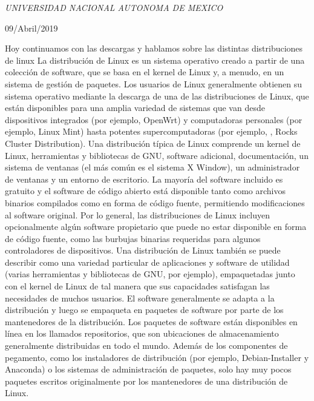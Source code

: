\documentclass[a4paper, 11pt, oneside]{article}
\begin{document}
\begin{titlepage}
	\textit{UNIVERSIDAD NACIONAL AUTONOMA DE MEXICO} 
	
	\vfill
	
	
	
	
	\vspace{0.3\baselineskip} 
	
	09/Abril/2019 
	
	

\end{titlepage}
Hoy continuamos con las descargas y hablamos sobre las distintas distribuciones de linux
La distribución de Linux es un sistema operativo creado a partir de una colección de software, que se basa en el kernel de Linux y, a menudo, en un sistema de gestión de paquetes. Los usuarios de Linux generalmente obtienen su sistema operativo mediante la descarga de una de las distribuciones de Linux, que están disponibles para una amplia variedad de sistemas que van desde dispositivos integrados (por ejemplo, OpenWrt) y computadoras personales (por ejemplo, Linux Mint) hasta potentes supercomputadoras (por ejemplo, , Rocks Cluster Distribution). Una distribución típica de Linux comprende un kernel de Linux, herramientas y bibliotecas de GNU, software adicional, documentación, un sistema de ventanas (el más común es el sistema X Window), un administrador de ventanas y un entorno de escritorio. La mayoría del software incluido es gratuito y el software de código abierto está disponible tanto como archivos binarios compilados como en forma de código fuente, permitiendo modificaciones al software original. Por lo general, las distribuciones de Linux incluyen opcionalmente algún software propietario que puede no estar disponible en forma de código fuente, como las burbujas binarias requeridas para algunos controladores de dispositivos. Una distribución de Linux también se puede describir como una variedad particular de aplicaciones y software de utilidad (varias herramientas y bibliotecas de GNU, por ejemplo), empaquetadas junto con el kernel de Linux de tal manera que sus capacidades satisfagan las necesidades de muchos usuarios. El software generalmente se adapta a la distribución y luego se empaqueta en paquetes de software por parte de los mantenedores de la distribución. Los paquetes de software están disponibles en línea en los llamados repositorios, que son ubicaciones de almacenamiento generalmente distribuidas en todo el mundo. Además de los componentes de pegamento, como los instaladores de distribución (por ejemplo, Debian-Installer y Anaconda) o los sistemas de administración de paquetes, solo hay muy pocos paquetes escritos originalmente por los mantenedores de una distribución de Linux.
\end{document}

